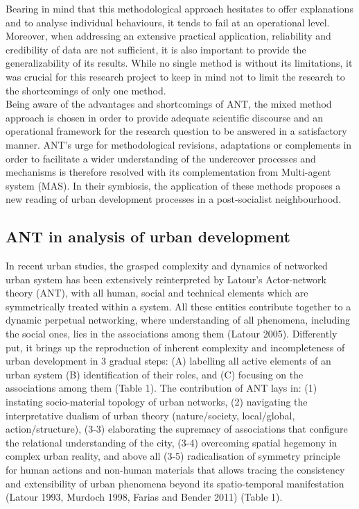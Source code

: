 \documentclass[11pt]{report}
\begin{document}
Bearing in mind that this methodological approach hesitates to offer explanations and to analyse individual behaviours, it tends to fail at an operational level.
Moreover, when addressing an extensive practical application, reliability and credibility of data are not sufficient, it is also important to provide the generalizability of its results.
While no single method is without its limitations, it was crucial for this research project to keep in mind not to limit the research to the shortcomings of only one method.
\\

Being aware of the advantages and shortcomings of ANT, the mixed method approach is chosen in order to provide adequate scientific discourse and an operational framework for the research question to be answered in a satisfactory manner.
ANT's urge for methodological revisions, adaptations or complements in order to facilitate a wider understanding of the undercover processes and mechanisms is therefore resolved with its complementation from Multi-agent system (MAS).
In their symbiosis, the application of these methods proposes a new reading of urban development processes in a post-socialist neighbourhood.

\subsection{ANT in analysis of urban development}

In recent urban studies, the grasped complexity and dynamics of networked urban system has been extensively reinterpreted by Latour’s Actor-network theory (ANT), with all human, social and technical elements which are symmetrically treated within a system. All these entities contribute together to a dynamic perpetual networking, where understanding of all phenomena, including the social ones, lies in the associations among them  (Latour 2005). Differently put, it brings up the reproduction of inherent complexity and incompleteness of urban development in 3 gradual steps:  (A) labelling all active elements of an urban system (B) identification of their roles, and (C) focusing on the associations among them (Table 1). The contribution of ANT lays in: (1) instating socio-material topology of urban networks, (2) navigating the interpretative dualism of urban theory (nature/society, local/global, action/structure), (3-3) elaborating the supremacy of associations that configure the relational understanding of the city, (3-4) overcoming spatial hegemony in complex urban reality, and above all (3-5) radicalisation of  symmetry principle for human  actions  and non-human  materials  that  allows tracing the consistency and extensibility of urban phenomena beyond its spatio-temporal manifestation  (Latour 1993, Murdoch 1998, Farias and Bender 2011) (Table 1).
\\
\end{document}
